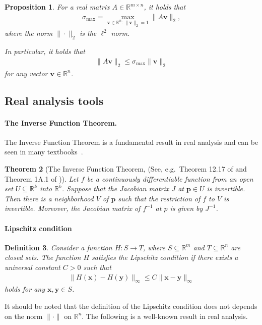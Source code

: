 \documentclass[letterpaper,11pt]{article}
\newtheorem{theorem}{Theorem}[section]
\newtheorem{definition}[theorem]{Definition}
\newtheorem{proposition}[theorem]{Proposition}
\begin{document}
\begin{proposition} \label{prop:singularvalue}
For a real matrix $A\in\mathbb{R}^{m\times n}$, it holds that
\begin{align*}
\sigma_{\max}=\max_{\mathbf{v}\in \mathbb{R}^n:\|\mathbf{v}\|_2=1}\|A\mathbf{v}\|_2,
\end{align*}
where the norm $\|\cdot\|_2$ is the $\ell^2$ norm.

In particular, it holds that
\begin{align*}
\|A\mathbf{v}\|_2\leq \sigma_{\max}\|\mathbf{v}\|_2
\end{align*}
for any vector $\mathbf{v}\in\mathbb{R}^n$.
\end{proposition}
%




\subsection{Real analysis tools}\label{sec:lipschitzcondition}
\paragraph*{The Inverse Function Theorem.}
The Inverse Function Theorem is a fundamental result in real analysis and can be seen in many textbooks~\cite{DR14,Krantz16}.
  
\begin{theorem}[The Inverse Function Theorem, (See, e.g.~Theorem 12.17 of \cite{Krantz16} and Theorem 1A.1 of \cite{DR14})] \label{thm:IFT}
Let $f$ be a continuously differentiable function from an open set $U\subseteq \mathbb{R}^k$ into $\mathbb{R}^k$.
Suppose that the Jacobian matrix $J$ at $\mathbf{p}\in U$ is invertible.
Then there is a neighborhood $V$ of $\mathbf{p}$ such that the restriction of $f$ to $V$ is invertible.
Moreover, the Jacobian matrix of $f^{-1}$ at $p$ is given by $J^{-1}$.
\end{theorem}

\paragraph*{Lipschitz condition} 
\begin{definition} \label{def:lipschitzdef}
Consider a function $H:S\to T$, where $S\subseteq\mathbb{R}^m$ and $T\subseteq\mathbb{R}^n$ are closed sets.
The function $H$ satisfies the \emph{Lipschitz condition} if there exists a universal constant $C>0$ such that
\begin{align*}
\|H(\mathbf{x})-H(\mathbf{y})\|_\infty \leq C\|\mathbf{x}-\mathbf{y}\|_\infty
\end{align*}
holds for any $\mathbf{x},\mathbf{y}\in S$.
\end{definition}
It should be noted that the definition of the Lipschitz condition does not depends on the norm $\|\cdot\|$ on $\mathbb{R}^n$.
The following is a well-known result in real analysis.
\end{document}
